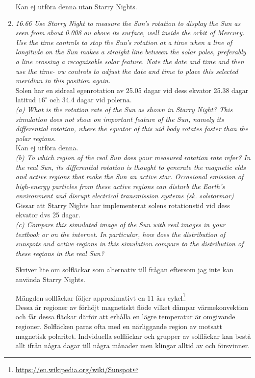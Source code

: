\documentclass[./exercises.tex]{subfiles}
\begin{document}
\begin{enumerate}
Kan ej utföra denna utan Starry Nights.\\



\item \textit{16.66 Use Starry Night to measure the Sun’s rotation to display the Sun as seen from about 0.008 au above its surface, well inside the orbit of
Mercury. Use the time controls to stop the Sun’s rotation at a time when a line of longitude on the
Sun makes a straight line between the solar poles, preferably a line crossing a recognisable solar
feature. Note the date and time and then use the time- ow controls to adjust the date and time to
place this selected meridian in this position again.}\\

Solen har en sidreal egenrotation av 25.05 dagar vid dess ekvator
25.38 dagar latitud $16^\circ$ och 34.4 dagar vid polerna.\\

\textit{(a) What is the rotation rate of the Sun as shown in Starry Night? This simulation does not
show on important feature of the Sun, namely its differential rotation, where the equator of this uid
body rotates faster than the polar regions.}\\

Kan ej utföra denna.\\

\textit{(b) To which region of the real Sun does your measured rotation rate refer? In the real Sun, its
differential rotation is thought to generate the magnetic elds and active regions that make the Sun
an active star. Occasional emission of high-energy particles from these active regions can disturb
the Earth’s environment and disrupt electrical transmission systems (sk. solstormar)}\\

Gissar att Starry Nights har implementerat solens rotationstid vid dess ekvator dvs 25 dagar.\\

\textit{(c) Compare this simulated image of the Sun with real images in your textbook or on the
internet. In particular, how does the distribution of sunspots and active regions in this
simulation compare to the distribution of these regions in the real Sun?}

Skriver lite om solfläckar som alternativ till frågan eftersom jag inte kan använda Starry Nights.

Mängden solfläckar följer approximativt en 11 års cykel\footnote{\url{https://en.wikipedia.org/wiki/Sunspot}}\\
Dessa är regioner av förhöjt magnetiskt flöde vilket dämpar värmekonvektion och får dessa fläckar 
därför att erhålla en lägre temperatur är omgivande regioner.
Solfläcken paras ofta med en närliggande region av motsatt magnetisk polaritet.
Indviduella solfläckar och grupper av solfläckar kan bestå allt ifrån några dagar till några månader
men klingar alltid av och försvinner.\\


\end{enumerate}
\end{document}
